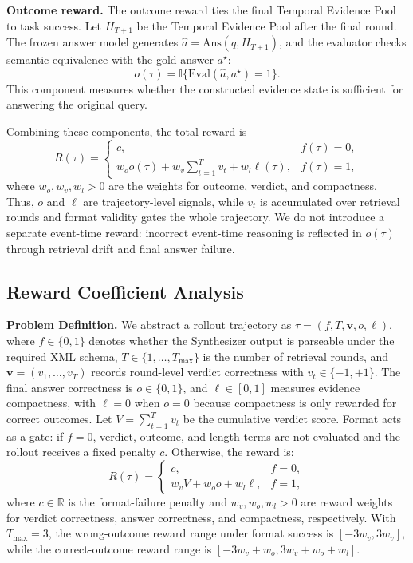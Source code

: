 \noindent\textbf{Outcome reward.}
The outcome reward ties the final Temporal Evidence Pool to task success. Let
$H_{T+1}$ be the Temporal Evidence Pool after the final round. The frozen answer
model generates $\hat{a}=\mathrm{Ans}(q,H_{T+1})$, and the evaluator checks
semantic equivalence with the gold answer $a^\star$:
\[
o(\tau)=\mathbb{I}\{\mathrm{Eval}(\hat{a},a^\star)=1\}.
\]
This component measures whether the constructed evidence state is sufficient
for answering the original query.

Combining these components, the total reward is
\[
R(\tau)
=
\begin{cases}
c, & f(\tau)=0,\\
w_o o(\tau)+w_v\sum_{t=1}^{T}v_t+w_l\ell(\tau), & f(\tau)=1,
\end{cases}
\]
where $w_o,w_v,w_l>0$ are the weights for outcome, verdict, and compactness.
Thus, $o$ and $\ell$ are trajectory-level signals, while $v_t$ is accumulated
over retrieval rounds and format validity gates the whole trajectory. We do not
introduce a separate event-time reward: incorrect event-time reasoning is
reflected in $o(\tau)$ through retrieval drift and final answer failure.

\subsection{Reward Coefficient Analysis}
\label{app:reward-design-coefficients}

\noindent\textbf{Problem Definition.}
We abstract a rollout trajectory as
$\tau=(f,T,\mathbf{v},o,\ell)$, where $f\in\{0,1\}$ denotes whether the
Synthesizer output is parseable under the required XML schema,
$T\in\{1,\ldots,T_{\max}\}$ is the number of retrieval rounds, and
$\mathbf{v}=(v_1,\ldots,v_T)$ records round-level verdict correctness with
$v_t\in\{-1,+1\}$. The final answer correctness is $o\in\{0,1\}$, and
$\ell\in[0,1]$ measures evidence compactness, with $\ell=0$ when $o=0$ because
compactness is only rewarded for correct outcomes. Let
$V=\sum_{t=1}^{T}v_t$ be the cumulative verdict score. Format acts as a gate:
if $f=0$, verdict, outcome, and length terms are not evaluated and the rollout
receives a fixed penalty $c$. Otherwise, the reward is:
\[
R(\tau)=
\begin{cases}
c, & f=0,\\
w_vV+w_o o+w_l\ell, & f=1,
\end{cases}
\]
where $c\in\mathbb{R}$ is the format-failure penalty and
$w_v,w_o,w_l>0$ are reward weights for verdict correctness, answer correctness,
and compactness, respectively. With $T_{\max}=3$, the wrong-outcome reward range
under format success is $[-3w_v,3w_v]$, while the correct-outcome reward range
is $[-3w_v+w_o,3w_v+w_o+w_l]$.


